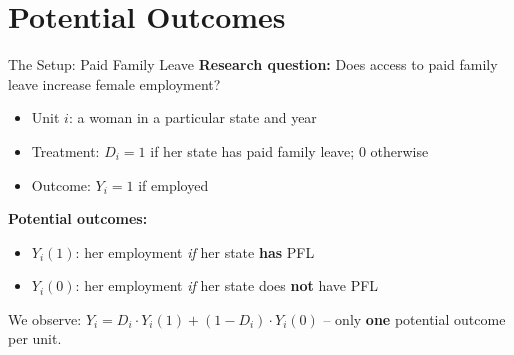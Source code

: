 
\section{Potential Outcomes}

\begin{frame}{The Setup: Paid Family Leave}
  \textbf{Research question:} Does access to paid family leave increase female employment?

  \vspace{10pt}

  \begin{itemize}
    \item Unit $i$: a woman in a particular state and year
    \item Treatment: $D_i = 1$ if her state has paid family leave; $0$ otherwise
    \item Outcome: $Y_i = 1$ if employed
  \end{itemize}

  \vspace{10pt}

  \textbf{Potential outcomes:}
  \begin{itemize}
    \item $Y_i(1)$: her employment \textit{if} her state \textbf{has} PFL
    \item $Y_i(0)$: her employment \textit{if} her state does \textbf{not} have PFL
  \end{itemize}

  \vspace{8pt}

  We observe: $Y_i = D_i \cdot Y_i(1) + (1-D_i) \cdot Y_i(0)$ \quad -- only \textbf{one} potential outcome per unit.
\end{frame}

